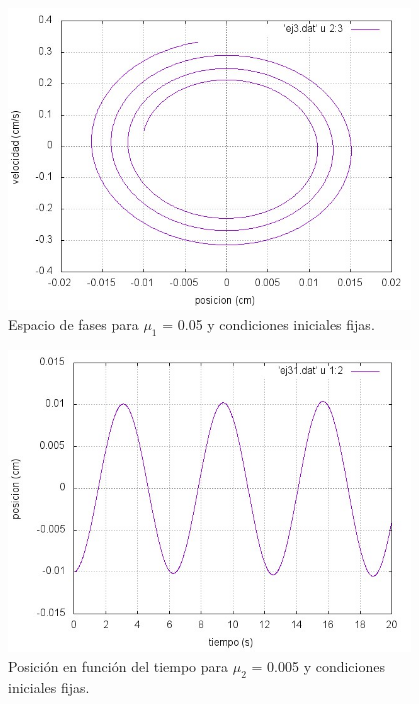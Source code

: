\documentclass[a4paper,12pt]{article}
\begin{document}
\begin{itemize}
\begin{figure}[H]
\begin{center}
\includegraphics[height=8cm]{grafico_ej3_xVSv.jpg}
\caption[width=5cm]{Espacio de fases para $\mu_1$ = 0.05 y condiciones iniciales fijas.}
\end{center}
\end{figure}


\begin{figure}[H]
\begin{center}
\includegraphics[height=8cm]{grafico_ej31_xVSt.jpg}
\caption[width=5cm]{Posici\'on en funci\'on del tiempo para $\mu_2$ = 0.005 y condiciones iniciales fijas.}
\end{center}
\end{figure}


\end{itemize}
\end{document}
